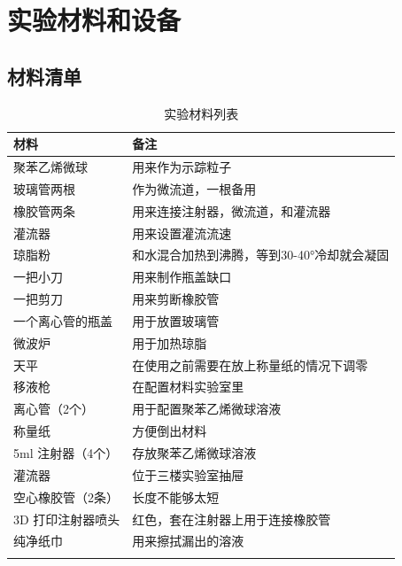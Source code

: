 \documentclass[12pt]{article}
\begin{document}
\section{实验材料和设备}
\subsection{材料清单}

{
    \footnotesize
    \begin{longtable}{@{} p{5cm} p{10cm} @{}}
        \toprule
        \textbf{材料} & \textbf{备注} \\ 
        \midrule
        
        
        聚苯乙烯微球        & 用来作为示踪粒子\\
        玻璃管两根          & 作为微流道，一根备用\\
        橡胶管两条              & 用来连接注射器，微流道，和灌流器 \\
        灌流器              & 用来设置灌流流速 \\
        琼脂粉              & 和水混合加热到沸腾，等到30-40°冷却就会凝固\\
        一把小刀            & 用来制作瓶盖缺口      \\
        一把剪刀            & 用来剪断橡胶管    \\
        一个离心管的瓶盖    & 用于放置玻璃管\\
        微波炉              & 用于加热琼脂 \\
        天平                 & 在使用之前需要在放上称量纸的情况下调零 \\ 
        移液枪               & 在配置材料实验室里 \\ 
        离心管（2个）        & 用于配置聚苯乙烯微球溶液 \\ 
        称量纸               & 方便倒出材料   \\
        5ml 注射器（4个）    & 存放聚苯乙烯微球溶液 \\ 
        灌流器               & 位于三楼实验室抽屉 \\ 
        空心橡胶管（2条）    & 长度不能够太短 \\ 
        3D 打印注射器喷头    & 红色，套在注射器上用于连接橡胶管 \\ 
        纯净纸巾             & 用来擦拭漏出的溶液 \\ 
        \bottomrule
        \caption{实验材料列表} \\
    \end{longtable}
}
\end{document}
